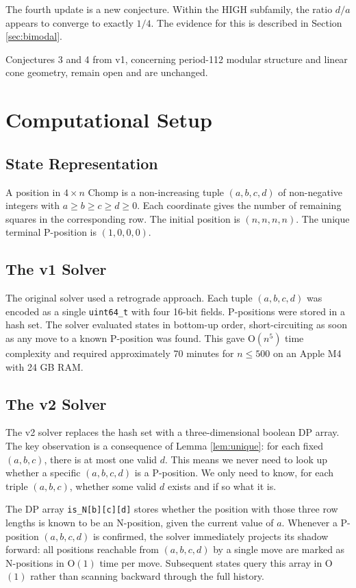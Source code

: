 \documentclass[12pt]{article}
\begin{document}
The fourth update is a new conjecture. Within the HIGH subfamily, the
ratio $d/a$ appears to converge to exactly $1/4$. The evidence for
this is described in Section \ref{sec:bimodal}.

Conjectures 3 and 4 from v1, concerning period-112 modular structure
and linear cone geometry, remain open and are unchanged.

\section{Computational Setup}
\label{sec:solver}

\subsection{State Representation}

A position in $4 \times n$ Chomp is a non-increasing tuple
$(a, b, c, d)$ of non-negative integers with $a \geq b \geq c \geq
d \geq 0$. Each coordinate gives the number of remaining squares in
the corresponding row. The initial position is $(n, n, n, n)$. The
unique terminal P-position is $(1, 0, 0, 0)$.

\subsection{The v1 Solver}

The original solver used a retrograde approach. Each tuple
$(a,b,c,d)$ was encoded as a single \texttt{uint64\_t} with four
16-bit fields. P-positions were stored in a hash set. The solver
evaluated states in bottom-up order, short-circuiting as soon as
any move to a known P-position was found. This gave O$(n^5)$ time
complexity and required approximately 70 minutes for $n \leq 500$
on an Apple M4 with 24 GB RAM.

\subsection{The v2 Solver}

The v2 solver replaces the hash set with a three-dimensional boolean
DP array. The key observation is a consequence of
Lemma \ref{lem:unique}: for each fixed $(a,b,c)$, there is at most
one valid $d$. This means we never need to look up whether a
specific $(a,b,c,d)$ is a P-position. We only need to know, for
each triple $(a,b,c)$, whether some valid $d$ exists and if so what
it is.

The DP array \texttt{is\_N[b][c][d]} stores whether the position with
those three row lengths is known to be an N-position, given the current
value of $a$. Whenever a P-position $(a,b,c,d)$ is confirmed, the
solver immediately projects its shadow forward: all positions reachable
from $(a,b,c,d)$ by a single move are marked as N-positions in O$(1)$
time per move. Subsequent states query this array in O$(1)$ rather than
scanning backward through the full history.
\end{document}
